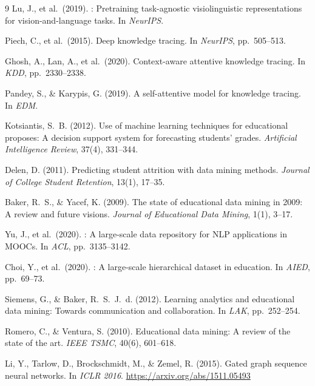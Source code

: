 \documentclass[sigconf,review]{acmart}
\begin{document}
\begin{thebibliography}{9}
Lu, J., et al.\ (2019).
: Pretraining task-agnostic
  visiolinguistic representations for
  vision-and-language tasks.
\newblock In \emph{NeurIPS}.

Piech, C., et al.\ (2015).
\newblock Deep knowledge tracing.
\newblock In \emph{NeurIPS}, pp.\ 505--513.

Ghosh, A., Lan, A., et al.\ (2020).
\newblock Context-aware attentive knowledge tracing.
\newblock In \emph{KDD}, pp.\ 2330--2338.

Pandey, S., \& Karypis, G. (2019).
\newblock A self-attentive model for knowledge
  tracing.
\newblock In \emph{EDM}.

Kotsiantis, S.~B. (2012).
\newblock Use of machine learning techniques for
  educational proposes: A decision support system
  for forecasting students' grades.
\newblock \emph{Artificial Intelligence Review},
  37(4), 331--344.

Delen, D. (2011).
\newblock Predicting student attrition with data
  mining methods.
\newblock \emph{Journal of College Student
  Retention}, 13(1), 17--35.

Baker, R.~S., \& Yacef, K. (2009).
\newblock The state of educational data mining in
  2009: A review and future visions.
\newblock \emph{Journal of Educational Data Mining},
  1(1), 3--17.

Yu, J., et al.\ (2020).
: A large-scale data repository
  for {NLP} applications in {MOOCs}.
\newblock In \emph{ACL}, pp.\ 3135--3142.

Choi, Y., et al.\ (2020).
: A large-scale hierarchical dataset
  in education.
\newblock In \emph{AIED}, pp.\ 69--73.

Siemens, G., \& Baker, R.~S.~J.~d. (2012).
\newblock Learning analytics and educational data
  mining: Towards communication and collaboration.
\newblock In \emph{LAK}, pp.\ 252--254.

Romero, C., \& Ventura, S. (2010).
\newblock Educational data mining: A review of the
  state of the art.
\newblock \emph{IEEE TSMC}, 40(6), 601--618.

Li, Y., Tarlow, D., Brockschmidt, M., \& Zemel, R. (2015).
\newblock Gated graph sequence neural networks.
\newblock In \emph{ICLR 2016}.
\newblock \url{https://arxiv.org/abs/1511.05493}


\end{thebibliography}
\end{document}
